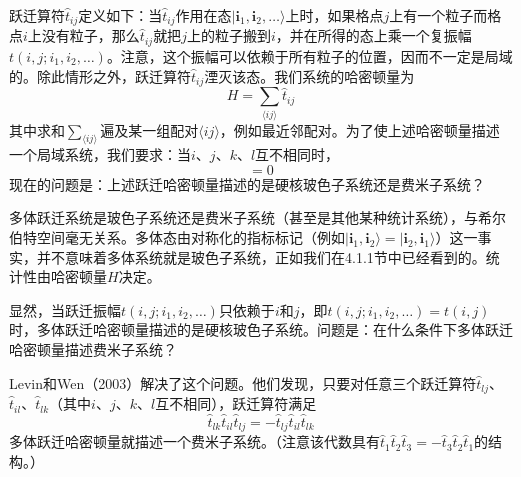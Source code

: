 跃迁算符$\hat{t}_{ij}$定义如下：当$\hat{t}_{ij}$作用在态$|\pmb{i}_1,\pmb{i}_2,\ldots\rangle$上时，如果格点$j$上有一个粒子而格点$i$上没有粒子，那么$\hat{t}_{ij}$就把$j$上的粒子搬到$i$，并在所得的态上乘一个复振幅$t(i,j;i_1,i_2,\ldots)$。注意，这个振幅可以依赖于所有粒子的位置，因而不一定是局域的。除此情形之外，跃迁算符$\hat{t}_{ij}$湮灭该态。我们系统的哈密顿量为
\begin{equation*}
H=\sum_{\langle ij\rangle}\hat{t}_{ij}
\end{equation*}
其中求和$\sum_{\langle ij\rangle}$遍及某一组配对$\langle ij\rangle$，例如最近邻配对。为了使上述哈密顿量描述一个局域系统，我们要求：当$i$、$j$、$k$、$l$互不相同时，
\begin{equation*}
[\hat{t}_{ij},\hat{t}_{kl}]=0
\end{equation*}
现在的问题是：上述跃迁哈密顿量描述的是硬核玻色子系统还是费米子系统？

多体跃迁系统是玻色子系统还是费米子系统（甚至是其他某种统计系统），与希尔伯特空间毫无关系。多体态由对称化的指标标记（例如$|\pmb{i}_1,\pmb{i}_2\rangle=|\pmb{i}_2,\pmb{i}_1\rangle$）这一事实，并不意味着多体系统就是玻色子系统，正如我们在4.1.1节中已经看到的。统计性由哈密顿量$H$决定。

显然，当跃迁振幅$t(i,j;i_1,i_2,\ldots)$只依赖于$i$和$j$，即$t(i,j;i_1,i_2,\ldots)=t(i,j)$时，多体跃迁哈密顿量描述的是硬核玻色子系统。问题是：在什么条件下多体跃迁哈密顿量描述费米子系统？

Levin和Wen（2003）解决了这个问题。他们发现，只要对任意三个跃迁算符$\hat{t}_{lj}$、$\hat{t}_{il}$、$\hat{t}_{lk}$（其中$i$、$j$、$k$、$l$互不相同），跃迁算符满足
\begin{equation*}
\hat{t}_{lk}\hat{t}_{il}\hat{t}_{lj}=-\hat{t}_{lj}\hat{t}_{il}\hat{t}_{lk}\tag{4.1.9}
\end{equation*}
多体跃迁哈密顿量就描述一个费米子系统。（注意该代数具有$\hat{t}_1\hat{t}_2\hat{t}_3=-\hat{t}_3\hat{t}_2\hat{t}_1$的结构。）

